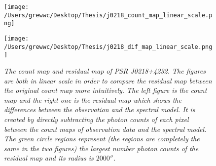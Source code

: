 \documentclass[12pt]{report}
\newcommand{\mycaption}[1]{\caption{\textit{\footnotesize #1}}}
\newcommand{\change}[1]{
  $<$\colorbox{red}{\textbf{change}}$>$#1$<$\colorbox{red}{\textbf{/change}}$>$
}
\begin{document}

            \begin{figure}[!ht]
              \begin{center}
              \begin{minipage}{0.45\textwidth}
                \begin{center} 
                  \texttt{[image: /Users/grewwc/Desktop/Thesis/j0218\_count\_map\_linear\_scale.png]}
                \end{center}
              \end{minipage}
              \begin{minipage}{0.45\textwidth}
                \begin{center}
                  \texttt{[image: /Users/grewwc/Desktop/Thesis/j0218\_dif\_map\_linear\_scale.png]}
                \end{center}
              \end{minipage}
            \end{center}
            \mycaption{The count map and residual map of PSR J0218+4232.
              The figures are both in linear scale in order to compare the residual map between the 
              original count map more intuitively. The left figure is the count map and the right 
              one is the residual map which shows the differences between the observation and the spectral 
              model. It is created by directly subtracting the photon counts of each pixel between 
              the count maps of observation data and the spectral model. The green circle regions represent
              (the regions are completely the same in the two figures)
              the largest number photon counts of the residual map and its radius is $2000''$.}
            \label{fig: j0218_count_map_diff}
            \end{figure}
\end{document}
